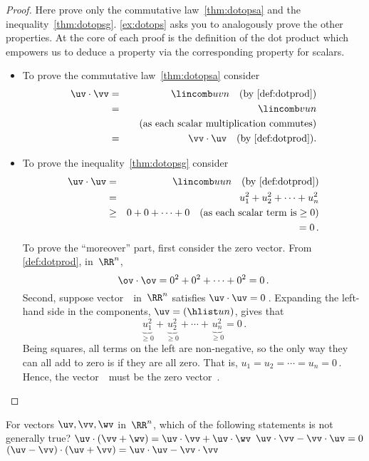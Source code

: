 \begin{proof} 
Here prove only the commutative law~\ref{thm:dotopsa} and the inequality~\ref{thm:dotopsg}.
\cref{ex:dotops} asks you to analogously prove the other properties.
At the core of each proof is the definition of the dot product which empowers us to deduce a property via the corresponding property for scalars.
\begin{itemize}
\item To prove the commutative law~\ref{thm:dotopsa} consider
\begin{eqnarray*}
\uv\cdot\vv&=&\lincomb uvn \quad(\text{by \cref{def:dotprod}})
\\&=&\lincomb vun
\\&&\quad(\text{as each scalar multiplication commutes})
\\&=&\vv\cdot\uv \quad(\text{by \cref{def:dotprod}}).
\end{eqnarray*}

\item To prove the inequality~\ref{thm:dotopsg} consider
\begin{eqnarray*}
\uv\cdot\uv&=&\lincomb uun\quad(\text{by \cref{def:dotprod}})
\\&=&u_1^2+u_2^2+\cdots+u_n^2
\\&\geq&0+0+\cdots+0 \quad(\text{as each scalar term is}\geq0)
\\&&{}=0\,.
\end{eqnarray*}
To prove the ``moreover'' part, first consider the zero vector.
From \cref{def:dotprod}, in~\(\RR^n\),
\begin{equation*}
\ov\cdot\ov={0^2+0^2+\cdots+0^2}=0\,.
\end{equation*}
Second, suppose vector~\uv\  in~\(\RR^n\) satisfies \(\uv\cdot\uv=0\)\,.
Expanding the left-hand side in the components, \(\uv=(\hlist un)\), gives that
\begin{equation*}
\underbrace{u_1^2}_{\geq0}+\underbrace{u_2^2}_{\geq0}
+\cdots+\underbrace{u_n^2}_{\geq0}=0\,.
\end{equation*}
Being squares, all terms on the left are non-negative, so the only way they can all add to zero is if they are all zero.
That is, \(u_1=u_2=\cdots=u_n=0\)\,.
Hence, the vector~\uv\ must be the zero vector~\ov.
\end{itemize}
\end{proof}


\begin{activity}
For vectors \(\uv,\vv,\wv\) in~\(\RR^n\), which of the following statements is not generally true?
{\(\uv\cdot(\vv+\wv)=\uv\cdot\vv+\uv\cdot\wv\)}
{\(\uv\cdot\vv-\vv\cdot\uv=0\)}
{\((\uv-\vv)\cdot(\uv+\vv)=\uv\cdot\uv-\vv\cdot\vv\)}
\end{activity}



